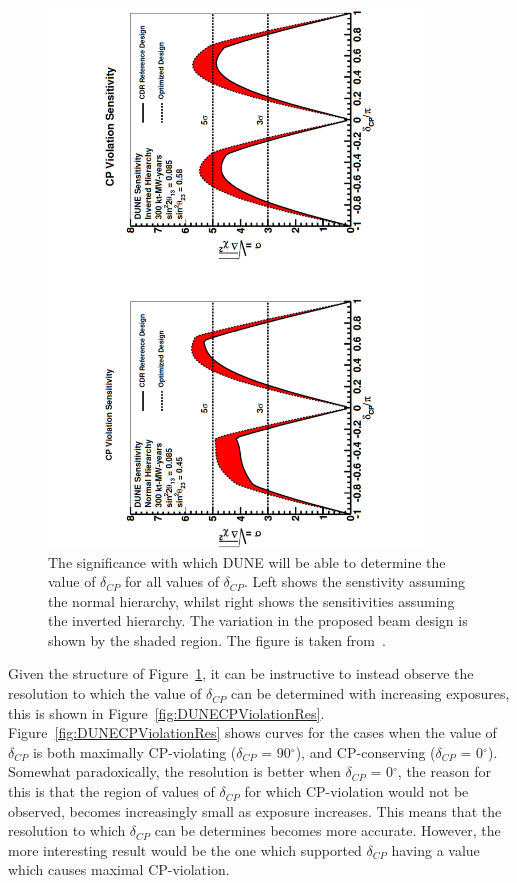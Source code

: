 \begin{figure}[h!]
  \centering
  \includegraphics[width=0.9\textwidth]{DUNECPViolation}
  \caption[The significance with which DUNE will be able to determine the value of $\delta_{CP}$ for all values of $\delta_{CP}$]
          {The significance with which DUNE will be able to determine the value of $\delta_{CP}$ for all values of $\delta_{CP}$. Left shows the senstivity assuming the normal hierarchy, whilst right shows the sensitivities assuming the inverted hierarchy. The variation in the proposed beam design is shown by the shaded region. The figure is taken from~\citep{DUNECDR_V2}.}
  \label{fig:DUNECPViolation}
\end{figure}

Given the structure of Figure~\ref{fig:DUNECPViolation}, it can be instructive to instead observe the resolution to which the value of $\delta_{CP}$ can be determined with increasing exposures, this is shown in Figure~\ref{fig:DUNECPViolationRes}. Figure~\ref{fig:DUNECPViolationRes} shows curves for the cases when the value of $\delta_{CP}$ is both maximally CP-violating ($\delta_{CP}$ = 90$^{\circ}$), and CP-conserving ($\delta_{CP}$ = 0$^{\circ}$). Somewhat paradoxically, the resolution is better when $\delta_{CP}$ = 0$^{\circ}$, the reason for this is that the region of values of $\delta_{CP}$ for which CP-violation would not be observed, becomes increasingly small as exposure increases. This means that the resolution to which $\delta_{CP}$ can be determines becomes more accurate. However, the more interesting result would be the one which supported $\delta_{CP}$ having a value which causes maximal CP-violation. \\

